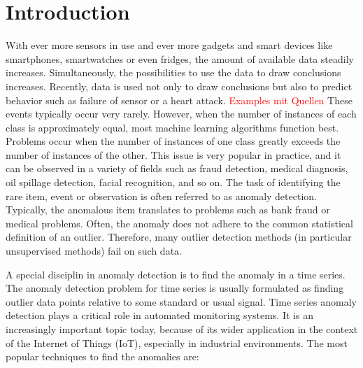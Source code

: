 
\chapter{Introduction} %

\label{1.} %


\newcommand{\keyword}[1]{\textbf{#1}}
\newcommand{\tabhead}[1]{\textbf{#1}}
\newcommand{\code}[1]{\texttt{#1}}
\newcommand{\file}[1]{\texttt{\bfseries#1}}
\newcommand{\option}[1]{\texttt{\itshape#1}}




With ever more sensors in use and ever more gadgets and smart devices like smartphones, smartwatches or even fridges, the amount of available data steadily increases. Simultaneously, the possibilities to use the data to draw conclusions increases. Recently, data is used not only to draw conclusions but also to predict behavior such as failure of sensor or a heart attack. \textcolor{red}{Examples mit Quellen} These events typically occur very rarely. However, when the number of instances of each class is approximately equal, most machine learning algorithms function best. Problems occur when the number of instances of one class greatly exceeds the number of instances of the other. This issue is very popular in practice, and it can be observed in a variety of fields such as fraud detection, medical diagnosis, oil spillage detection, facial recognition, and so on. The task of identifying the rare item, event or observation is often referred to as anomaly detection. Typically, the anomalous item translates to problems such as bank fraud or medical problems. Often, the anomaly does not adhere to the common statistical definition of an outlier. Therefore, many outlier detection methods (in particular unsupervised methods) fail on such data. 

A special disciplin in anomaly detection is to find the anomaly in a time series. The anomaly detection problem for time series is usually formulated as finding outlier data points relative to some standard or usual signal. Time series anomaly detection plays a critical role in automated monitoring systems. It is an increasingly important
topic today, because of its wider application in the context of the Internet of Things (IoT), especially in industrial environments. The most popular techniques to find the anomalies are:

